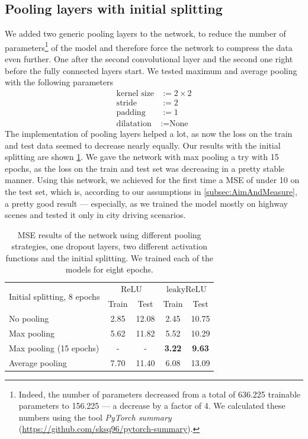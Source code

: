 \documentclass[conference]{IEEEtran}
\begin{document}
\subsection{Pooling layers with initial splitting}
We added two generic pooling layers to the network, to reduce the number of parameters\footnote{Indeed, 
the number of parameters decreased from a total of 636.225 trainable parameters to 156.225 --- a 
decrease by a factor of 4. We calculated these numbers using the tool \emph{PyTorch summary} 
(\url{https://github.com/sksq96/pytorch-summary}).} of the model and 
therefore force the network to compress the data even further. One after the second 
convolutional layer and the second one right before the fully connected layers start.
We tested maximum and average pooling with the following parameters
\begin{align*}
\text{kernel size} &:= 2\times 2\\
\text{stride} &:= 2\\
\text{padding} &:= 1\\
\text{dilatation} &:= \text{None}
\end{align*}
The implementation of pooling layers helped a lot, as now the loss on the train and test data seemed to 
decrease nearly equally. Our results with the initial splitting are shown 
\cref{tab:ResultsInitialSplitting}. We gave the network
with max pooling a try with 15 epochs, as the loss on the train and test set was decreasing in a pretty 
stable manner. Using this network, we achieved for the first time a MSE of under 10 on the test set,
which is, according to our assumptions in \cref{subsec:AimAndMeasure}, a 
pretty good result --- especially, as we trained the model mostly on highway scenes and tested it only 
in city driving scenarios.
\begin{table}[!t]
\normalsize
\centering
\begin{tabular}{lcccc}
\toprule
\multirow{2}{*}{Initial splitting, 8 epochs}  & \multicolumn{2}{c}{$\mathrm{ReLU}$} & \multicolumn{2}{c}{$\mathrm{leakyReLU}$} \\
 & Train & Test & Train & Test\\
\midrule
No pooling & 2.85 & 12.08 & 2.45 & 10.75 \\
Max pooling & 5.62 & 11.82 & 5.52 & 10.29 \\
Max pooling (15 epochs) & - & - & \textbf{3.22} & \textbf{9.63} \\
Average pooling & 7.70 & 11.40 & 6.08 & 13.09\\
\bottomrule
\end{tabular}
\caption{MSE results of the network using different pooling strategies, one dropout layers, two different activation functions and 
the initial splitting. We trained each of the models for eight epochs.}
\label{tab:ResultsInitialSplitting}
\end{table}
\end{document}
